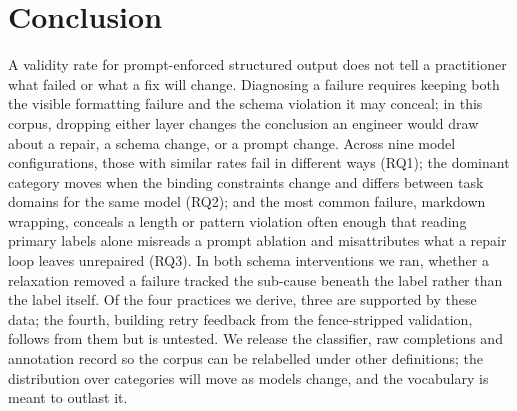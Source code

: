 \section{Conclusion}
\label{sec:conclusion}

A validity rate for prompt-enforced structured output does not tell a
practitioner what failed or what a fix will change. Diagnosing a failure
requires keeping both the visible formatting failure and the schema
violation it may conceal; in this corpus, dropping either layer changes
the conclusion an engineer would draw about a repair, a schema change, or
a prompt change. Across
nine model configurations, those with similar rates fail
in different ways (RQ1); the dominant category moves when the binding constraints
change and differs between task domains for the same model (RQ2); and the
most common failure, markdown wrapping, conceals a length or pattern
violation often enough that reading primary labels alone misreads a
prompt ablation and misattributes what a repair loop leaves unrepaired
(RQ3). In both schema interventions we ran, whether a relaxation removed
a failure tracked the sub-cause beneath the label rather than the label
itself. Of the four practices we derive,
three are supported by these data; the fourth, building retry feedback
from the fence-stripped validation, follows from them but is untested. We release the classifier, raw
completions and annotation record so the corpus can be relabelled under
other definitions; the distribution over categories will move as models
change, and the vocabulary is meant to outlast it.
